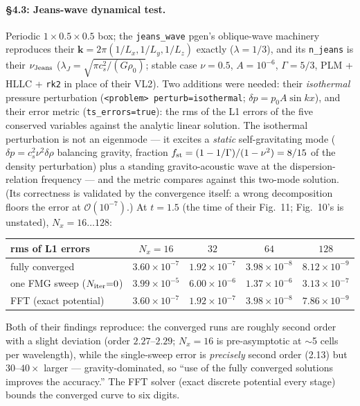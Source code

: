 \documentclass[11pt]{article}
\newcommand{\code}[1]{\texttt{#1}}
\begin{document}
\paragraph{\S4.3: Jeans-wave dynamical test.}
Periodic $1 \times 0.5 \times 0.5$ box; the \code{jeans\_wave} pgen's oblique-wave
machinery reproduces their $\mathbf{k} = 2\pi(1/L_x, 1/L_y, 1/L_z)$ exactly
($\lambda = 1/3$), and its \code{n\_jeans} is their $\nu_{\rm Jeans}$
($\lambda_J = \sqrt{\pi c_s^2/(G\rho_0)}$; stable case $\nu = 0.5$, $A = 10^{-6}$,
$\Gamma = 5/3$, PLM + HLLC + \code{rk2} in place of their VL2). Two additions were
needed: their \emph{isothermal} pressure perturbation
(\code{<problem> perturb=isothermal}; $\delta p = p_0 A \sin kx$), and their error
metric (\code{ts\_errors=true}): the rms of the L1 errors of the five conserved
variables against the analytic linear solution. The isothermal perturbation is not
an eigenmode --- it excites a \emph{static} self-gravitating mode
($\delta p = c_s^2 \nu^2 \delta\rho$ balancing gravity, fraction
$f_{\rm st} = (1 - 1/\Gamma)/(1 - \nu^2) = 8/15$ of the density perturbation) plus
a standing gravito-acoustic wave at the dispersion-relation frequency --- and the
metric compares against this two-mode solution. (Its correctness is validated by
the convergence itself: a wrong decomposition floors the error at
$\mathcal{O}(10^{-7})$.) At $t = 1.5$ (the time of their Fig.~11; Fig.~10's is
unstated), $N_x = 16 \ldots 128$:
\begin{center}
\small
\begin{tabular}{@{}lcccc@{}}
\toprule
rms of L1 errors & $N_x{=}16$ & $32$ & $64$ & $128$ \\
\midrule
fully converged & $3.60\times10^{-7}$ & $1.92\times10^{-7}$ & $3.98\times10^{-8}$ & $8.12\times10^{-9}$ \\
one FMG sweep ($N_{\rm iter}{=}0$) & $3.99\times10^{-5}$ & $6.00\times10^{-6}$ & $1.37\times10^{-6}$ & $3.13\times10^{-7}$ \\
FFT (exact potential) & $3.60\times10^{-7}$ & $1.92\times10^{-7}$ & $3.98\times10^{-8}$ & $7.86\times10^{-9}$ \\
\bottomrule
\end{tabular}
\end{center}
Both of their findings reproduce: the converged runs are roughly second order with
a slight deviation (order $2.27$--$2.29$; $N_x{=}16$ is pre-asymptotic at
$\sim$5 cells per wavelength), while the single-sweep error is \emph{precisely}
second order (2.13) but $30$--$40\times$ larger --- gravity-dominated, so
``use of the fully converged solutions improves the accuracy.'' The FFT solver
(exact discrete potential every stage) bounds the converged curve to six digits.
\end{document}
